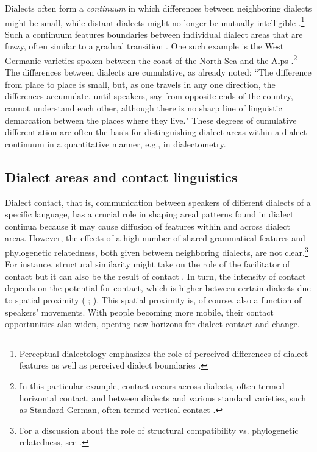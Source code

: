\documentclass[output=paper]{langscibook}
\begin{document}
Dialects often form a \textit{continuum} in which differences between neighboring dialects might be small, while distant dialects might no longer be mutually intelligible \parencite[cf.][5--7]{Chambers2004}.\footnote{Perceptual dialectology emphasizes the role of perceived differences of dialect features as well as perceived dialect boundaries \parencite[]{Niedzielski2000, Cramer2016}.} Such a continuum features boundaries between individual dialect areas that are fuzzy, often similar to a gradual transition \parencite[][5]{Pickl2016}. One such example is the West Germanic varieties spoken between the coast of the North Sea and the Alps \parencite[5--7]{Chambers2004}.\footnote{In this particular example, contact occurs across dialects, often termed horizontal contact, and between dialects and various standard varieties, such as Standard German, often termed vertical contact \parencite{Auer2011}.} The differences between dialects are cumulative, as \textcite[51]{Bloomfield1933} already noted: “The difference from place to place is small, but, as one travels in any one direction, the differences accumulate, until speakers, say from opposite ends of the country, cannot understand each other, although there is no sharp line of linguistic demarcation between the places where they live." These degrees of cumulative differentiation are often the basis for distinguishing dialect areas within a dialect continuum in a quantitative manner, e.g., in dialectometry. 

\subsection{Dialect areas and contact linguistics}

Dialect contact, that is, communication between speakers of different dialects of a specific language, has a crucial role in shaping areal patterns found in dialect continua  because it may cause diffusion of features within and across dialect areas. However, the effects of a high number of shared grammatical features and phylogenetic relatedness, both given between neighboring dialects, are not clear.\footnote{For a discussion about the role of structural compatibility vs. phylogenetic relatedness, see \citet[chapter 2]{Thomason1988}.} For instance, structural similarity might take on the role of the facilitator of contact but it can also be the result of contact \parencite[417--420]{Bowern2013a}. In turn, the intensity of contact depends on the potential for contact, which is higher between certain dialects due to spatial proximity (\citeauthor{Thomason1988} \citeyear*[50]{Thomason1988};  \citeauthor{Matras.2007} \citeyear*[31]{Matras.2007}). This spatial proximity is, of course, also a function of speakers' movements. With people becoming more mobile, their contact opportunities also widen, opening new horizons for dialect contact and change.
\end{document}
